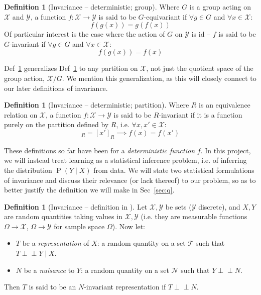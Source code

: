 \documentclass[12pt]{article}
\newcommand{\ci}{\perp\!\!\!\perp}
\newcommand{\Prob}[1]{\operatorname{P}\left(#1\right)}
\theoremstyle{definition}
\newtheorem{dfn}[thm]{Definition}
\numberwithin{equation}{section}
\numberwithin{figure}{section}
\numberwithin{table}{section}
\begin{document}
\begin{dfn}[Invariance -- deterministic; group]
    \label{dfn:inv-det-group}
    Where $G$ is a group acting on $\mathcal{X}$ and $\mathcal{Y}$, a function $f:\mathcal{X}\to \mathcal{Y}$ is said to be $G$-equivariant if $\forall g\in G$ and $\forall x\in \mathcal{X}$: 
    \begin{equation*}
        f(g(x))=g(f(x))
    \end{equation*}
    Of particular interest is the case where the action of $G$ on $\mathcal{Y}$ is $\mathrm{id}$ -- $f$ is said to be $G$-invariant if $\forall g\in G$ and $\forall x\in \mathcal{X}$: 
    \begin{equation*}
        f(g(x))=f(x)
    \end{equation*}
\end{dfn}

Def~\ref{dfn:inv-det-part} generalizes Def~\ref{dfn:inv-det-group} to any partition on $\mathcal{X}$, not just the quotient space of the group action, $\mathcal{X}/G$. We mention this generalization, as this will closely connect to our later definitions of invariance. 

\begin{dfn}[Invariance -- deterministic; partition]
    \label{dfn:inv-det-part}
    Where $R$ is an equivalence relation on $\mathcal{X}$, a function $f:\mathcal{X}\to \mathcal{Y}$ is said to be $R$-invariant if it is a function purely on the partition defined by $R$, i.e. $\forall x,x'\in \mathcal{X}$: 
    \begin{equation*}
        [x]_R=[x']_R \implies f(x)=f(x')
    \end{equation*}
\end{dfn}

These definitions so far have been for a \emph{deterministic function} $f$. In this project, we will instead treat learning as a statistical inference problem, i.e. of inferring the distribution $\Prob{Y\mid X}$ from data. We will state two statistical formulations of invariance and discuss their relevance (or lack thereof) to our problem, so as to better justify the definition we will make in Sec~\ref{sec:q}.

\begin{dfn}[Invariance -- definition in \cite{achille}]
    \label{dfn:inv-stat-achille}
    Let $\mathcal{X},\mathcal{Y}$ be sets ($\mathcal{Y}$ discrete), and $X, Y$ are random quantities taking values in $\mathcal{X},\mathcal{Y}$ (i.e. they are measurable functions $\Omega\to \mathcal{X}$, $\Omega\to \mathcal{Y}$ for sample space $\Omega$). Now let:
    \begin{itemize}
        \item $T$ be a \emph{representation} of $X$: a random quantity on a set $\mathcal{T}$ such that $T\ci Y\mid X$.
        \item $N$ be a \emph{nuisance} to $Y$: a random quantity on a set $\mathcal{N}$ such that $Y\ci N$. 
    \end{itemize}
    Then $T$ is said to be an $N$-invariant representation if $T\ci N$. 
\end{dfn}
\end{document}
